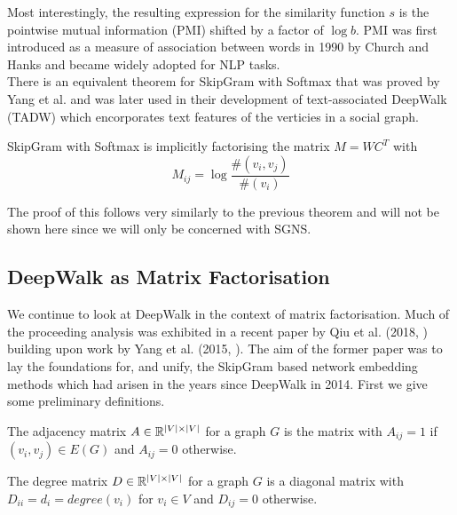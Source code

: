 \documentclass[a4paper]{article}
\begin{document}
\noindent Most interestingly, the resulting expression for the similarity function $s$ is
the pointwise mutual information (PMI) shifted by a factor of $\log b$. PMI was
first introduced as a measure of association between words in 1990 by Church and Hanks
\cite{church1990} and became widely adopted for NLP tasks.\\
There is an equivalent theorem for SkipGram with Softmax that was proved by Yang
et al.\cite{yangalternative2015} and was later used in their development of
text-associated DeepWalk (TADW)\cite{yang2015} which encorporates text features
of the verticies in a social graph.

\begin{theorem}[Yang et al. (2015)]
  SkipGram with Softmax is implicitly factorising the matrix $M = WC^T$ with
  \[M_{ij} = \log{\frac{\#(v_i,v_j)}{\#(v_i)}}\]
\end{theorem}
The proof of this follows very similarly to the previous theorem and will not be
shown here since we will only be concerned with SGNS.

\subsection{DeepWalk as Matrix Factorisation}
We continue to look at DeepWalk in the context of matrix factorisation. Much of the proceeding analysis was exhibited in a recent paper by Qiu et
al. (2018, \cite{qiu2018}) building upon work by Yang et al. (2015, \cite{yang2015}). The aim of the former paper was to lay the foundations for, and
unify, the SkipGram based network embedding methods which had arisen in the years since DeepWalk in 2014. First we give some preliminary definitions.
\begin{definition}
  The adjacency matrix $A \in \R^{|V| \times |V|}$ for a graph $G$ is the matrix with $A_{ij} = 1$ if $(v_i, v_j) \in E(G)$ and $A_{ij} = 0$ otherwise.
\end{definition}

\begin{definition}
  The degree matrix $D \in \R^{|V| \times |V|}$ for a graph $G$ is a diagonal
  matrix with $D_{ii} = d_i = degree(v_i)$ for $v_i \in V$ and $D_{ij} = 0$ otherwise.
\end{definition}
\end{document}
